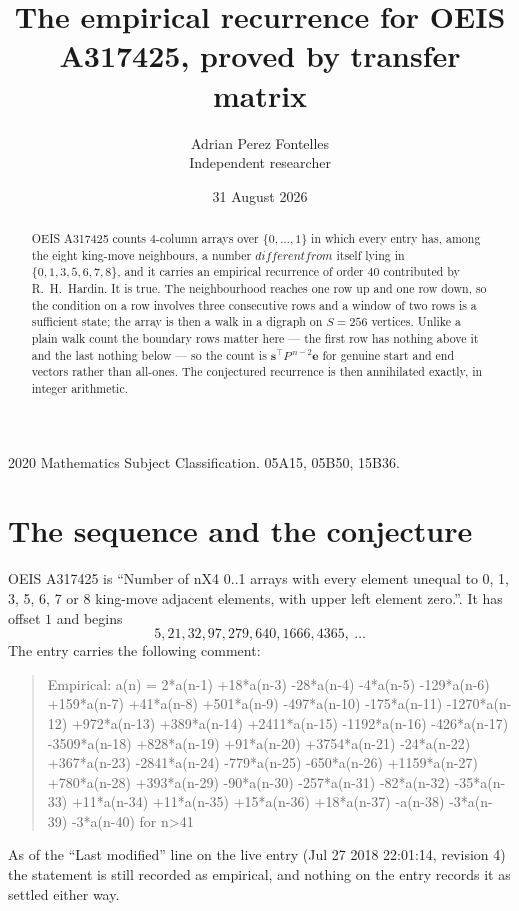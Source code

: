 \documentclass[11pt,a4paper]{article}
\title{The empirical recurrence for OEIS A317425, proved by transfer matrix}
\author{Adrian Perez Fontelles\\ \small Independent researcher}
\date{31 August 2026}
\theoremstyle{plain}
\theoremstyle{definition}
\begin{document}
\maketitle

\begin{abstract}
OEIS A317425 counts $4$-column arrays over $\{0,\dots,1\}$ in which every entry has,
among the eight king-move neighbours, a number $different from$ itself lying in $\{0,1,3,5,6,7,8\}$, and it carries an empirical
recurrence of order $40$ contributed by R.~H.~Hardin. It is true. The neighbourhood
reaches one row up and one row down, so the condition on a row involves three consecutive
rows and a window of two rows is a sufficient state; the array is then a walk in a digraph
on $S=256$ vertices. Unlike a plain walk count the boundary rows matter here --- the first
row has nothing above it and the last nothing below --- so the count is
$\mathbf{s}^{\!\top}P^{\,n-2}\mathbf{e}$ for genuine start and end vectors rather than
all-ones. The conjectured recurrence is then annihilated exactly, in integer arithmetic.
\end{abstract}

\noindent\small 2020 Mathematics Subject Classification. 05A15, 05B50, 15B36.\normalsize

\section{The sequence and the conjecture}

OEIS A317425 is ``Number of nX4 0..1 arrays with every element unequal to 0, 1, 3, 5, 6, 7 or 8 king-move adjacent elements, with upper left element zero.''. It has offset
$1$ and begins
\[
5, 21, 32, 97, 279, 640, 1666, 4365,\ \dots
\]
The entry carries the following comment:
\begin{quote}\small
Empirical: a(n) = 2*a(n-1) +18*a(n-3) -28*a(n-4) -4*a(n-5) -129*a(n-6) +159*a(n-7) +41*a(n-8) +501*a(n-9) -497*a(n-10) -175*a(n-11) -1270*a(n-12) +972*a(n-13) +389*a(n-14) +2411*a(n-15) -1192*a(n-16) -426*a(n-17) -3509*a(n-18) +828*a(n-19) +91*a(n-20) +3754*a(n-21) -24*a(n-22) +367*a(n-23) -2841*a(n-24) -779*a(n-25) -650*a(n-26) +1159*a(n-27) +780*a(n-28) +393*a(n-29) -90*a(n-30) -257*a(n-31) -82*a(n-32) -35*a(n-33) +11*a(n-34) +11*a(n-35) +15*a(n-36) +18*a(n-37) -a(n-38) -3*a(n-39) -3*a(n-40) for n>41
\end{quote}
As of the ``Last modified'' line on the live entry (Jul 27 2018 22:01:14, revision
4) the statement is still recorded as empirical, and nothing on the entry
records it as settled either way.
\end{document}
